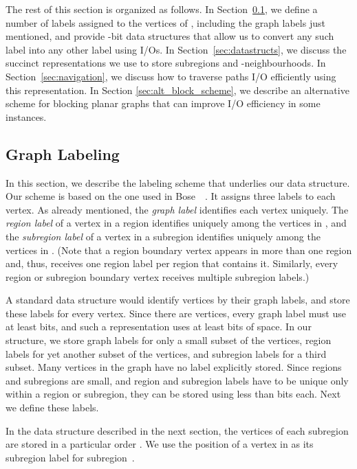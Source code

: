 The rest of this section is organized as follows.
In Section~\ref{sec:graph_labelling}, we define a number of labels
assigned to the vertices of , including the graph labels just
mentioned, and provide -bit data structures that allow us to
convert any such label into any other label using  I/Os.
In Section~\ref{sec:datastructs}, we discuss the succinct
representations we use to store subregions and
-neighbourhoods.
In Section~\ref{sec:navigation},
we discuss how to traverse paths I/O efficiently using this
representation.
In Section \ref{sec:alt_block_scheme}, we describe an 
alternative scheme
for blocking planar graphs that can improve I/O efficiency in 
some instances.

\subsection{Graph Labeling}


\label{sec:graph_labelling}

In this section, we describe the labeling scheme that underlies our
data structure.
Our scheme is based on the one used in
Bose~\etal~\cite{DBLP:journals/talg/BoseCHMM12}.
It assigns three labels to each vertex.
As already mentioned, the \emph{graph label}  identifies each vertex
 uniquely.
The \emph{region label}  of a vertex  in a region 
identifies  uniquely among the vertices in , and the
\emph{subregion label}  of a vertex  in a subregion
 identifies  uniquely
among the vertices in .
(Note that a region boundary vertex appears in more than one region and,
thus, receives one region label per region that contains it.
Similarly, every region or subregion boundary vertex receives multiple
subregion labels.)

A standard data structure would identify vertices by their graph labels, and
store these labels for every vertex.
Since there are  vertices, every graph label must use at least
 bits, and such a representation uses at least  bits of space.
In our structure, we store graph labels for only a small subset of the vertices, 
region labels for yet another subset of the vertices, and subregion labels for 
a third subset. 
Many vertices in the graph have no label explicitly stored.
Since regions and subregions are small, and region and subregion labels have to
be unique only within a region or subregion, they can be stored using
less than  bits each.
Next we define these labels.

In the data structure described in the next section, the vertices of
each subregion  are stored in a particular order .
We use the position of a vertex  in  as its
subregion label  for subregion~.

